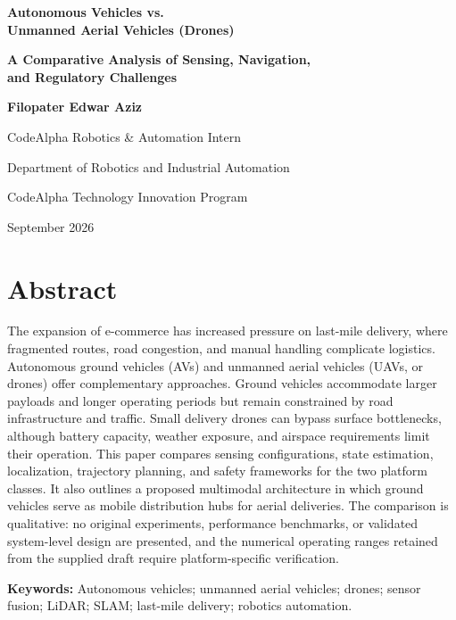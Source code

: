 \documentclass[11pt,a4paper]{article}
\begin{document}
\thispagestyle{plain}

\begin{center}
    {\LARGE\bfseries Autonomous Vehicles vs.\\[3pt]
    Unmanned Aerial Vehicles (Drones)\par}
    \vspace{8pt}
    {\large\bfseries A Comparative Analysis of Sensing, Navigation,\\
    and Regulatory Challenges\par}
    \vspace{12pt}
    {\normalsize\textbf{Filopater Edwar Aziz}\par
    CodeAlpha Robotics \& Automation Intern\par
    Department of Robotics and Industrial Automation\par
    CodeAlpha Technology Innovation Program\par}
    \vspace{5pt}
    {\small September 2026\par}
\end{center}

\section*{Abstract}
The expansion of e-commerce has increased pressure on last-mile delivery, where fragmented routes, road congestion, and manual handling complicate logistics. Autonomous ground vehicles (AVs) and unmanned aerial vehicles (UAVs, or drones) offer complementary approaches. Ground vehicles accommodate larger payloads and longer operating periods but remain constrained by road infrastructure and traffic. Small delivery drones can bypass surface bottlenecks, although battery capacity, weather exposure, and airspace requirements limit their operation. This paper compares sensing configurations, state estimation, localization, trajectory planning, and safety frameworks for the two platform classes. It also outlines a proposed multimodal architecture in which ground vehicles serve as mobile distribution hubs for aerial deliveries. The comparison is qualitative: no original experiments, performance benchmarks, or validated system-level design are presented, and the numerical operating ranges retained from the supplied draft require platform-specific verification.

\textbf{Keywords:} Autonomous vehicles; unmanned aerial vehicles; drones; sensor fusion; LiDAR; SLAM; last-mile delivery; robotics automation.
\end{document}
